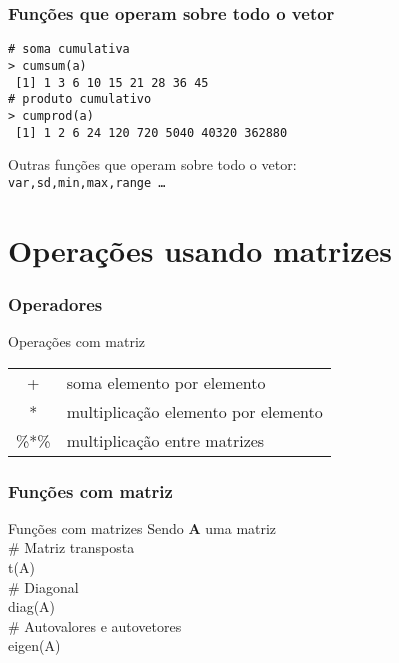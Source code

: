 \documentclass{beamer}
\begin{document}
 \begin{frame}
   \frametitle{Funções que operam sobre todo o vetor}
\texttt{\# soma cumulativa\\
> cumsum(a)\\
~[1]  1  3  6 10 15 21 28 36 45\\ \vspace{10pt} \pause
\# produto cumulativo \\
> cumprod(a) \\
~[1]      1      2      6     24    120    720   5040  40320 362880\\} \vspace{10pt} \pause

Outras funções que operam sobre todo o vetor: \\ \texttt{var,sd,min,max,range \ldots}
 \end{frame}
 

\section{Operações usando matrizes}
\begin{frame}
  \begin{center}
  \frametitle{Operadores}
    \begin{block}{Operações com matriz}
       \begin{tabular}{c l}
            + & soma elemento por elemento\\
            *& multiplicação elemento por elemento \\
          \%*\%& multiplicação entre matrizes \\
         \end{tabular}
     \end{block}
\end{center}  
\end{frame}

 \begin{frame}
 \frametitle{Funções com matriz}

 \begin{block}{Funções com matrizes}
 Sendo \textbf{A} uma matriz \\ \vspace{10pt} \pause
 \# Matriz transposta\\
 t(A)  \\ \vspace{10pt} \pause
 \# Diagonal  \\
 diag(A)  \\ \vspace{10pt} \pause
 \# Autovalores e autovetores \\
eigen(A)
    \end{block}
 \end{frame}
\end{document}
